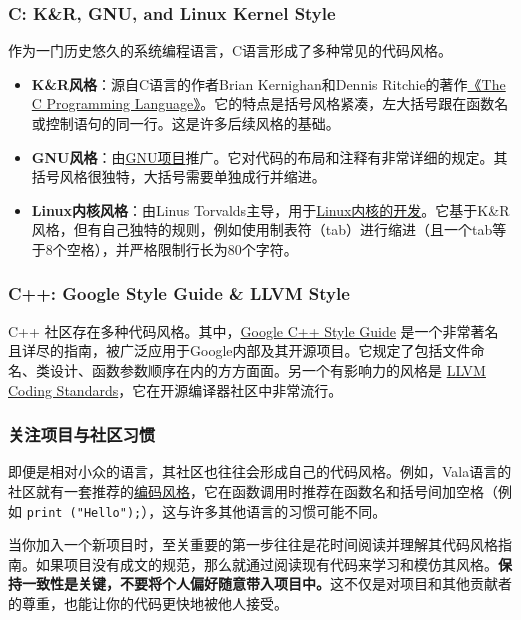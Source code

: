 \documentclass[../main.tex]{subfiles}
\begin{document}
\subsubsection{C: K\&R, GNU, and Linux Kernel Style}
作为一门历史悠久的系统编程语言，C语言形成了多种常见的代码风格。
\begin{itemize}
    \item \textbf{K\&R风格}：源自C语言的作者Brian Kernighan和Dennis Ritchie的著作\href{https://en.wikipedia.org/wiki/The_C_Programming_Language}{《The C Programming Language》}。它的特点是括号风格紧凑，左大括号跟在函数名或控制语句的同一行。这是许多后续风格的基础。
    \item \textbf{GNU风格}：由\href{https://www.gnu.org/prep/standards/standards.html}{GNU项目}推广。它对代码的布局和注释有非常详细的规定。其括号风格很独特，大括号需要单独成行并缩进。
    \item \textbf{Linux内核风格}：由Linus Torvalds主导，用于\href{https://www.kernel.org/doc/html/latest/process/coding-style.html}{Linux内核的开发}。它基于K\&R风格，但有自己独特的规则，例如使用制表符（tab）进行缩进（且一个tab等于8个空格），并严格限制行长为80个字符。
\end{itemize}

\subsubsection{C++: Google Style Guide \& LLVM Style}
C++ 社区存在多种代码风格。其中，\href{https://google.github.io/styleguide/cppguide.html}{Google C++ Style Guide} 是一个非常著名且详尽的指南，被广泛应用于Google内部及其开源项目。它规定了包括文件命名、类设计、函数参数顺序在内的方方面面。另一个有影响力的风格是 \href{https://llvm.org/docs/CodingStandards.html}{LLVM Coding Standards}，它在开源编译器社区中非常流行。

\subsubsection{关注项目与社区习惯}
即便是相对小众的语言，其社区也往往会形成自己的代码风格。例如，Vala语言的社区就有一套推荐的\href{https://wiki.gnome.org/Projects/Vala/Style}{编码风格}，它在函数调用时推荐在函数名和括号间加空格（例如 \texttt{print ("Hello");}），这与许多其他语言的习惯可能不同。

当你加入一个新项目时，至关重要的第一步往往是花时间阅读并理解其代码风格指南。如果项目没有成文的规范，那么就通过阅读现有代码来学习和模仿其风格。\textbf{保持一致性是关键，不要将个人偏好随意带入项目中。}这不仅是对项目和其他贡献者的尊重，也能让你的代码更快地被他人接受。
\end{document}
